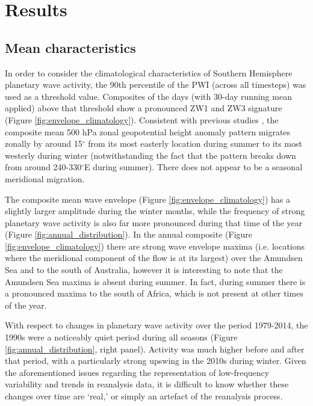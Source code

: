 \section{Results}

\subsection{Mean characteristics}

In order to consider the climatological characteristics of Southern Hemisphere planetary wave activity, the 90th percentile of the PWI (across all timesteps) was used as a threshold value. Composites of the days (with 30-day running mean applied) above that threshold show a pronounced ZW1 and ZW3 signature (Figure \ref{fig:envelope_climatology}). Consistent with previous studies \citep{vanLoon1984,Mo1985}, the composite mean 500 hPa zonal geopotential height anomaly pattern migrates zonally by around 15$^{\circ}$ from its most easterly location during summer to its most westerly during winter (notwithstanding the fact that the pattern breaks down from around 240-330$^{\circ}$E during summer). There does not appear to be a seasonal meridional migration.

The composite mean wave envelope (Figure \ref{fig:envelope_climatology}) has a slightly larger amplitude during the winter months, while the frequency of strong planetary wave activity is also far more pronounced during that time of the year (Figure \ref{fig:annual_distribution}). In the annual composite (Figure \ref{fig:envelope_climatology}) there are strong wave envelope maxima (i.e. locations where the meridional component of the flow is at its largest) over the Amundsen Sea and to the south of Australia, however it is interesting to note that the Amundsen Sea maxima is absent during summer. In fact, during summer there is a pronounced maxima to the south of Africa, which is not present at other times of the year.

With respect to changes in planetary wave activity over the period 1979-2014, the 1990s were a noticeably quiet period during all seasons (Figure \ref{fig:annual_distribution}, right panel). Activity was much higher before and after that period, with a particularly strong upswing in the 2010s during winter. Given the aforementioned issues regarding the representation of low-frequency variability and trends in reanalysis data, it is difficult to know whether these changes over time are `real,' or simply an artefact of the reanalysis process.

